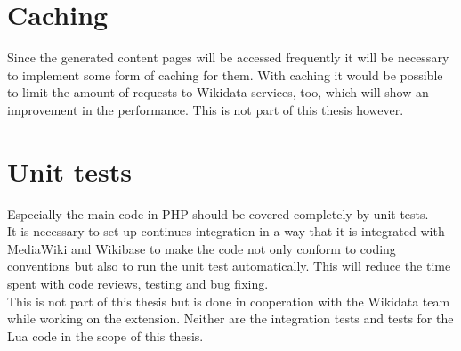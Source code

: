 \section{Caching}
Since the generated content pages will be accessed frequently  it will be necessary to implement some form of caching for them. With caching it would be possible to limit the amount of requests to Wikidata services, too, which will show an improvement in the performance. This is not part of this thesis however.

\section {Unit tests}
Especially the main code in PHP should be covered completely by unit tests. \\
It is necessary to set up continues integration in a way that it is integrated with MediaWiki and Wikibase to make the code not only conform to coding conventions but also to run the unit test automatically. This will reduce the time spent with code reviews, testing and bug fixing. \\
This is not part of this thesis but is done in cooperation with the Wikidata team while working on the extension. Neither are the integration tests and tests for the Lua code in the scope of this thesis. \\ 